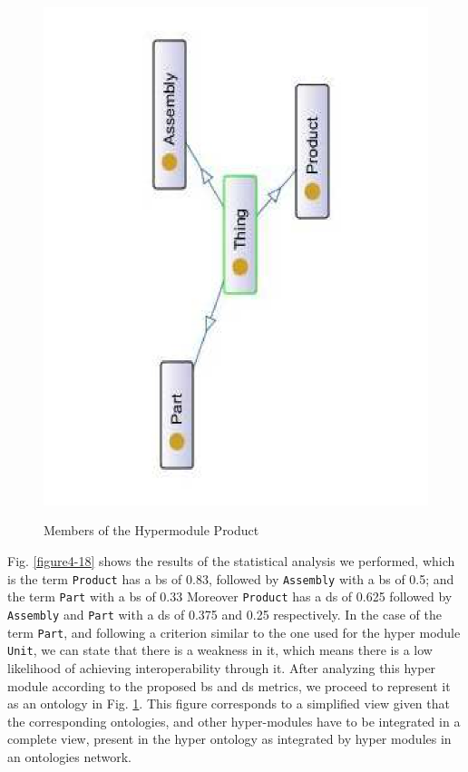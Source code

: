 \begin{figure}
\begin{minipage}{.55\textwidth}
		\includegraphics[scale=0.35, angle=270]{figure-chapterIV/fig4-19}\\
		\caption{Members of the Hypermodule Product}
		\label{figure4-19}
	\end{minipage}%
\end{figure}





Fig. \ref{figure4-18} shows the results of the statistical analysis we performed, which is the term \texttt{Product} has a \gls{bs} of 0.83, followed by \texttt{Assembly} with a \gls{bs} of 0.5; and the term \texttt{Part} with a \gls{bs} of 0.33 Moreover \texttt{Product} has a \gls{ds} of 0.625 followed by \texttt{Assembly} and \texttt{Part} with a \gls{ds} of 0.375 and 0.25 respectively. In the case of the term \texttt{Part}, and following a criterion similar to the one used for the hyper module \texttt{Unit}, we can state that there is a weakness in it, which means there is a low likelihood of achieving interoperability through it.  After analyzing  this hyper module according to the proposed \gls{bs} and \gls{ds} metrics, we proceed to represent it as an ontology in Fig. \ref{figure4-19}. This figure corresponds to a simplified view given that the corresponding ontologies, and other hyper-modules have to be integrated in a complete view, present in the hyper ontology as integrated by hyper modules in an ontologies network. 


